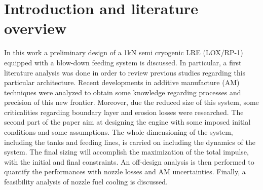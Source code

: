 \section{Introduction and literature overview}
\label{sec:introduction}
In this work a preliminary design of a 1kN semi cryogenic LRE (LOX/RP-1) equipped with a blow-down feeding system is discussed. In particular, a first literature analysis was done in order to review previous studies regarding this particular architecture. Recent developments in additive manufacture (AM) techniques were analyzed to obtain some knowledge regarding processes and precision of this new frontier. Moreover, due the reduced size of this system, some criticalities regarding boundary layer and erosion losses were researched.
The second part of the paper aim at designing the engine with some imposed initial conditions and some assumptions. The whole dimensioning of the system, including the tanks and feeding lines, is carried on including the dynamics of the system. The final sizing will accomplish the maximization of the total impulse, with the initial and final constraints. 
An off-design analysis is then performed to quantify the performances with nozzle losses and AM uncertainties. Finally, a feasibility analysis of  nozzle fuel cooling is discussed. 

